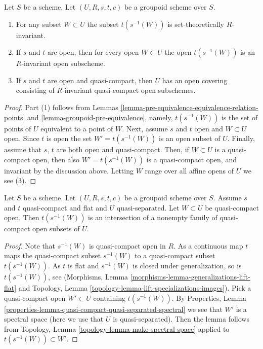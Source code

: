 \begin{lemma}
\label{lemma-constructing-invariant-opens}
Let $S$ be a scheme.
Let $(U, R, s, t, c)$ be a groupoid scheme over $S$.
\begin{enumerate}
\item For any subset $W \subset U$ the subset $t(s^{-1}(W))$
is set-theoretically $R$-invariant.
\item If $s$ and $t$ are open, then for every open $W \subset U$
the open $t(s^{-1}(W))$ is an $R$-invariant open subscheme.
\item If $s$ and $t$ are open and quasi-compact, then $U$ has an open
covering consisting of $R$-invariant quasi-compact open subschemes.
\end{enumerate}
\end{lemma}

\begin{proof}
Part (1) follows from
Lemmas \ref{lemma-pre-equivalence-equivalence-relation-points} and
\ref{lemma-groupoid-pre-equivalence}, namely, $t(s^{-1}(W))$
is the set of points of $U$ equivalent to a point of $W$.
Next, assume $s$ and $t$ open and $W \subset U$ open.
Since $t$ is open the set $W' = t(s^{-1}(W))$ is an open subset of $U$.
Finally, assume that $s$, $t$ are both open and quasi-compact.
Then, if $W \subset U$ is a quasi-compact open, then also
$W' = t(s^{-1}(W))$ is a quasi-compact open, and invariant by the
discussion above. Letting $W$ range over all affine opens of $U$
we see (3).
\end{proof}

\begin{lemma}
\label{lemma-first-observation}
Let $S$ be a scheme. Let $(U, R, s, t, c)$ be a groupoid scheme over $S$.
Assume $s$ and $t$ quasi-compact and flat and $U$ quasi-separated.
Let $W \subset U$ be quasi-compact open. Then $t(s^{-1}(W))$
is an intersection of a nonempty family of quasi-compact open subsets of $U$.
\end{lemma}

\begin{proof}
Note that $s^{-1}(W)$ is quasi-compact open in $R$.
As a continuous map $t$ maps the quasi-compact subset
$s^{-1}(W)$ to a quasi-compact subset $t(s^{-1}(W))$.
As $t$ is flat and $s^{-1}(W)$ is closed under generalization,
so is $t(s^{-1}(W))$, see
(Morphisms, Lemma \ref{morphisms-lemma-generalizations-lift-flat} and
Topology, Lemma \ref{topology-lemma-lift-specializations-images}).
Pick a quasi-compact open $W' \subset U$ containing $t(s^{-1}(W))$. By
Properties, Lemma \ref{properties-lemma-quasi-compact-quasi-separated-spectral}
we see that $W'$ is a spectral space (here we use that $U$ is quasi-separated).
Then the lemma follows from
Topology, Lemma \ref{topology-lemma-make-spectral-space}
applied to $t(s^{-1}(W)) \subset W'$.
\end{proof}

